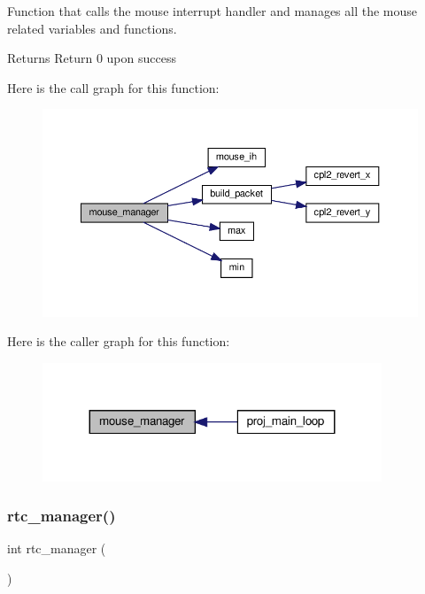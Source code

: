 Function that calls the mouse interrupt handler and manages all the mouse related variables and functions. 

\begin{DoxyReturn}{Returns}
Return 0 upon success 
\end{DoxyReturn}
Here is the call graph for this function\+:
\nopagebreak
\begin{figure}[H]
\begin{center}
\leavevmode
\includegraphics[width=350pt]{group__main__functions_ga8c9f11a032076f800d5d8e3faea17c9a_cgraph}
\end{center}
\end{figure}
Here is the caller graph for this function\+:
\nopagebreak
\begin{figure}[H]
\begin{center}
\leavevmode
\includegraphics[width=287pt]{group__main__functions_ga8c9f11a032076f800d5d8e3faea17c9a_icgraph}
\end{center}
\end{figure}
\mbox{\label{group__main__functions_gac1cad6d7c8507831aa74d165972cb1a9}} 
\subsubsection{\texorpdfstring{rtc\+\_\+manager()}{rtc\_manager()}}
{\footnotesize\ttfamily int rtc\+\_\+manager (\begin{DoxyParamCaption}{ }\end{DoxyParamCaption})}



